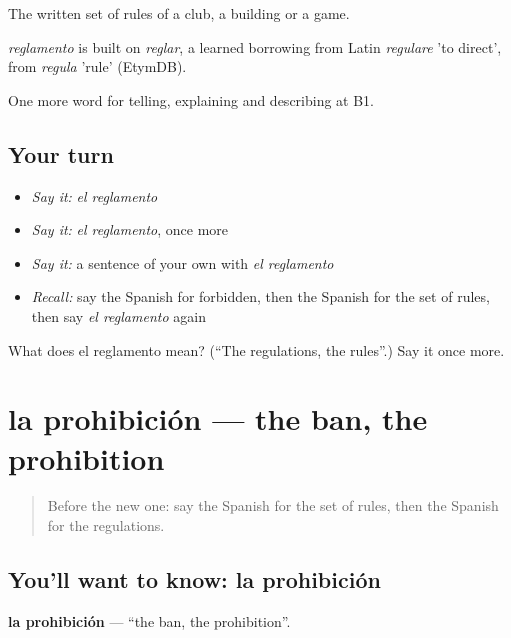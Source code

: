 The written set of rules of a club, a building or a game.

\begin{cousinweb}
\emph{reglamento} is built on \emph{reglar}, a learned borrowing from Latin \emph{regulare} 'to direct', from \emph{regula} 'rule' (EtymDB).
\end{cousinweb}

\begin{grammarlens}[title={What you've built}]
One more word for telling, explaining and describing at B1.
\end{grammarlens}

\subsection*{Your turn}
\begin{itemize}
\raggedright
  \item \emph{Say it:} \emph{el reglamento}
  \item \emph{Say it:} \emph{el reglamento}, once more
  \item \emph{Say it:} a sentence of your own with \emph{el reglamento}
  \item \emph{Recall:} say the Spanish for forbidden, then the Spanish for the set of rules, then say \emph{el reglamento} again
\end{itemize}

\begin{tcolorbox}[breakable,colback=teal!4,colframe=teal!35!black,title={Before you move on}]
What does el reglamento mean? (\textquotedblleft{}The regulations, the rules\textquotedblright{}.) Say it once more.
\end{tcolorbox}
\section[la prohibición]{la prohibición — the ban, the prohibition}

\label{lesson:ES-C622-prohibicion}



\begin{quote}
Before the new one: say the Spanish for the set of rules, then the Spanish for the regulations.
\end{quote}

\subsection*{You'll want to know: la prohibición}
\textbf{la prohibición} — \textquotedblleft{}the ban, the prohibition\textquotedblright{}.

